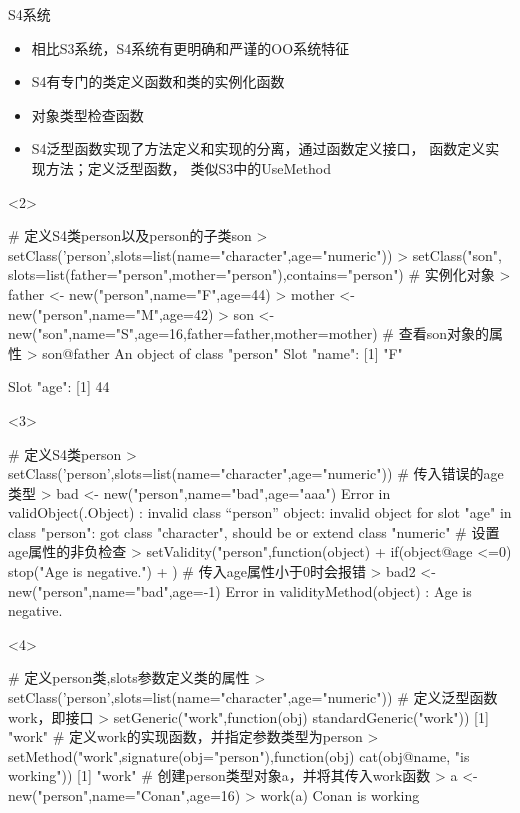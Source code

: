 \documentclass{beamerthemeMono}
\begin{document}
\begin{frame}[c,fragile]{\subsecname}{S4系统}
  \begin{itemize}
  \item<1-> 相比S3系统，S4系统有更明确和严谨的OO系统特征
  \item<2-> S4有专门的类定义函数和类的实例化函数
  \item<3-> 对象类型检查函数
  \item<4-> S4泛型函数实现了方法定义和实现的分离，通过函数定义接口，
    函数定义实现方法；定义泛型函数，
类似S3中的UseMethod
  \end{itemize}  

\begin{overlayarea}{\textwidth}{\textheight}
\begin{onlyenv}<2>
\begin{rcode}
# 定义S4类person以及person的子类son
> setClass('person',slots=list(name="character",age="numeric"))
> setClass("son", slots=list(father="person",mother="person"),contains="person")
# 实例化对象
> father <- new("person",name="F",age=44)
> mother <- new("person",name="M",age=42)
> son <- new("son",name="S",age=16,father=father,mother=mother)
# 查看son对象的属性
> son@father
An object of class "person"
Slot "name":
[1] "F"

Slot "age":
[1] 44
\end{rcode}  
\end{onlyenv}

\begin{onlyenv}<3>
\begin{rcode}
# 定义S4类person
> setClass('person',slots=list(name="character",age="numeric"))
# 传入错误的age类型
> bad <- new("person",name="bad",age="aaa")
Error in validObject(.Object) : 
  invalid class “person” object: invalid object for slot "age" in class "person": got class "character", should be or extend class "numeric"
# 设置age属性的非负检查
> setValidity("person",function(object){
+    if(object@age <=0) stop("Age is negative.")
+ })
# 传入age属性小于0时会报错
> bad2 <- new("person",name="bad",age=-1)
Error in validityMethod(object) : Age is negative.
\end{rcode}
\end{onlyenv}

\begin{onlyenv}<4>
\begin{rcode}
# 定义person类,slots参数定义类的属性
> setClass('person',slots=list(name="character",age="numeric"))
# 定义泛型函数work，即接口
> setGeneric("work",function(obj) standardGeneric("work"))
[1] "work"
# 定义work的实现函数，并指定参数类型为person
> setMethod("work",signature(obj="person"),function(obj) cat(obj@name, "is working"))
[1] "work"
# 创建person类型对象a，并将其传入work函数
> a <- new("person",name="Conan",age=16)
> work(a)
Conan is working
\end{rcode}  
\end{onlyenv}
\end{overlayarea}
\end{frame}
\end{document}
